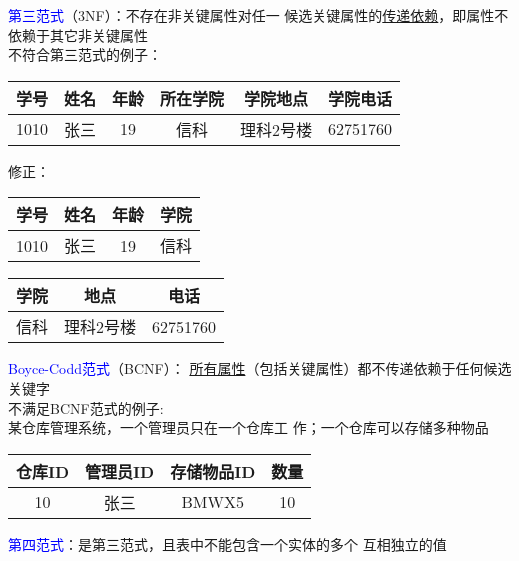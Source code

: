 \documentclass[compress]{beamer}
\begin{document}
\begin{frame}
   {
    \textcolor{blue}{第三范式}（3NF）：不存在非关键属性对任一
    候选关键属性的\uline{传递依赖}，即属性不依赖于其它非关键属性 \\[2ex]

    不符合第三范式的例子：\\[2ex]

    \begin{tabular}{|c|c|c|c|c|c|}
      \hline
      学号 & 姓名 & 年龄 & 所在学院 & 学院地点 & 学院电话 \\ \hline \hline
     1010 & 张三 & 19 & 信科 & 理科2号楼 & 62751760 \\
    \hline
  \end{tabular}

}

 {
  \vspace*{2ex}
  修正： \\[2ex]
  \small
    \begin{tabular}{|c|c|c|c|}
      \hline
      学号 & 姓名 & 年龄 & 学院 \\ \hline \hline
     1010 & 张三 & 19  & 信科 \\
    \hline
  \end{tabular}
  \begin{tabular}{|c|c|c|}
      \hline
      学院 & 地点 & 电话\\ \hline \hline
     信科 & 理科2号楼 & 62751760  \\
    \hline
  \end{tabular}
}


   {
    \textcolor{blue}{Boyce-Codd范式}（BCNF）：
    \uline{所有属性}（包括关键属性）都不传递依赖于任何候选关键字 \\[2ex]

    不满足BCNF范式的例子: \\
    某仓库管理系统，一个管理员只在一个仓库工
    作；一个仓库可以存储多种物品\\[2ex]

    \begin{tabular}{|c|c|c|c|}
      \hline
      仓库ID & 管理员ID & 存储物品ID & 数量 \\ \hline \hline
     10 & 张三 & BMWX5 & 10 \\
    \hline
  \end{tabular}


  }

   {
    \textcolor{blue}{第四范式}：是第三范式，且表中不能包含一个实体的多个
    互相独立的值 \\[2ex]

}
\end{frame}
\end{document}

